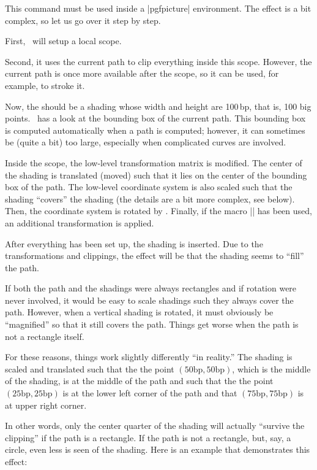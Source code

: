 \begin{command}{\pgfshadepath{}}
  This command must be used inside a |{pgfpicture}| environment. The
  effect is a bit complex, so let us go over it step by step.

  First, \pgfname\ will setup a local scope.

  Second, it uses the current path to clip everything inside this
  scope. However, the current path is once more available after the
  scope, so it can be used, for example, to stroke it.

  Now, the  should be a shading whose width and
  height are 100\,bp, that is, 100 big points. \pgfname\ has a look at
  the bounding box of the current path. This bounding box is computed
  automatically when a path is computed; however, it can sometimes be
  (quite a bit) too large, especially when complicated curves are
  involved. 

  Inside the scope, the low-level transformation matrix is modified.
  The center of the shading is translated (moved) such that it lies on
  the center of the bounding box of the path. The low-level coordinate
  system is also scaled such that the shading ``covers'' the shading (the 
  details are a bit more complex, see below). Then, the coordinate
  system is rotated by . Finally, if the macro 
  |\pgfsetadditionalshadetransform| has been used, an additional
  transformation is applied. 

  After everything has been set up, the shading is inserted. Due to
  the transformations and clippings, the effect will be that  the
  shading seems to ``fill'' the path.

  If both the path and the shadings were always rectangles and if
  rotation were never involved, it would be easy to scale shadings
  such they always cover the path. However, when a vertical shading is
  rotated, it must obviously be ``magnified'' so that it
  still covers the path. Things get worse when the path is not a
  rectangle itself.

  For these reasons, things work slightly differently ``in reality.''
  The shading is scaled and translated such that the
  the point $(50\mathrm{bp},50\mathrm{bp})$, which is the middle of
  the shading, is at the middle of the path and such that the the
  point $(25\mathrm{bp},25\mathrm{bp})$ is at the lower left corner of
  the path and that  $(75\mathrm{bp},75\mathrm{bp})$  is at upper
  right corner.

  In other words, only the center quarter of the shading will actually
  ``survive the clipping'' if the path is a rectangle. If the path is
  not a rectangle, but, say, a circle, even less is seen of the
  shading. Here is an example that demonstrates this effect:


\end{command}
